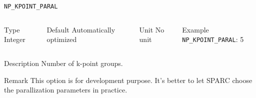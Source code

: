 \begin{frame}[allowframebreaks]{\texttt{NP\_KPOINT\_PARAL}} \label{NP_KPOINT_PARAL}
\vspace*{-12pt}
\begin{columns}
\begin{block}{Type}
Integer
\end{block}

\begin{block}{Default}
Automatically optimized
\end{block}

\begin{block}{Unit}
No unit
\end{block}

\begin{block}{Example}
\texttt{NP\_KPOINT\_PARAL}: 5
\end{block}
\end{columns}

\begin{block}{Description}
Number of k-point groups.
\end{block}

\begin{block}{Remark}
This option is for development purpose. It's better to let SPARC choose the parallization parameters in practice.
\end{block}
\end{frame}


